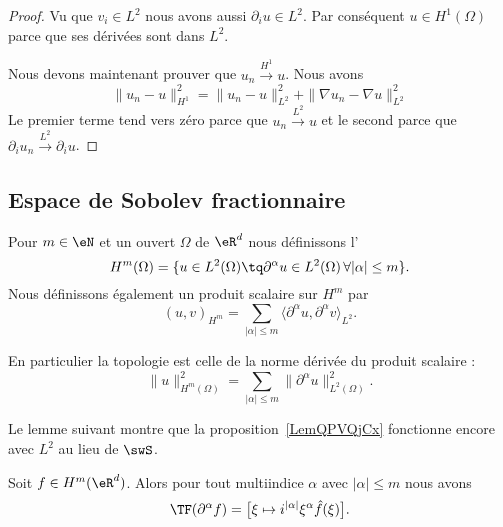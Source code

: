 \begin{proof}
	Vu que \( v_i\in L^2\) nous avons aussi \( \partial_iu\in L^2\). Par conséquent \( u\in H^1(\Omega)\) parce que ses dérivées sont dans \( L^2\).

	Nous devons maintenant prouver que \( u_n\stackrel{H^1}{\longrightarrow}u\). Nous avons
	\begin{equation}
		\| u_n-u \|^2_{H^1}=\| u_n -u\|^2_{L^2}+\| \nabla u_n-\nabla u \|^2_{L^2}
	\end{equation}
	Le premier terme tend vers zéro parce que \( u_n\stackrel{L^2}{\longrightarrow}u\) et le second parce que \( \partial_iu_n\stackrel{L^2}{\longrightarrow}\partial_iu\).
\end{proof}

\subsection{Espace de Sobolev fractionnaire}

\begin{definition}
	Pour \( m\in \eN\) et un ouvert \( \Omega\) de \( \eR^d\) nous définissons l'
	\begin{equation}
		H^m(\Omega)=\{ u\in L^2(\Omega)\tq \partial^{\alpha}u\in L^2(\Omega)\,\forall | \alpha |\leq m \}.
	\end{equation}
	Nous définissons également un produit scalaire sur \( H^m\) par
	\begin{equation}
		(u,v)_{H^m}=\sum_{| \alpha |\leq m}\langle \partial^{\alpha}u,  \partial^{\alpha}v  \rangle_{L^2}.
	\end{equation}
\end{definition}
En particulier la topologie est celle de la norme dérivée du produit scalaire :
\begin{equation}        \label{EQooMCWMooKKTqzM}
	\| u \|^2_{H^m(\Omega)}=\sum_{| \alpha |\leq m}\| \partial^{\alpha}u \|^2_{L^2(\Omega)}.
\end{equation}

Le lemme suivant montre que la proposition~\ref{LemQPVQjCx} fonctionne encore avec \( L^2\) au lieu de \( \swS\).
\begin{lemma} \label{LEMooAGBZooWCbPDd}
	Soit \( f\in H^m(\eR^d)\). Alors pour tout multiindice \( \alpha\) avec \( | \alpha |\leq m\) nous avons
	\begin{equation}
		\TF(\partial^{\alpha}f)=\big[ \xi\mapsto i^{| \alpha |}\xi^{\alpha}\hat f(\xi) \big].
	\end{equation}
\end{lemma}

